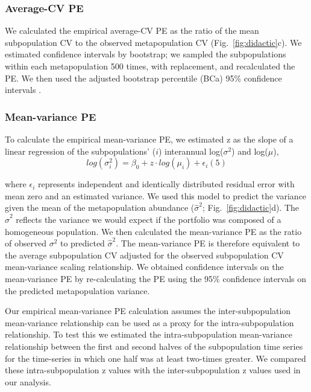 \subsubsection{Average-CV PE}

We calculated the empirical average-CV PE as the ratio of the mean subpopulation
CV to the observed metapopulation CV (Fig.~\ref{fig:didactic}c). We estimated
confidence intervals by bootstrap; we sampled the subpopulations within each
metapopulation 500 times, with replacement, and recalculated the PE. We then
used the adjusted bootstrap percentile (BCa) 95\% confidence intervals
\citep{canty2012}.

\subsubsection{Mean-variance PE}

To calculate the empirical mean-variance PE, we estimated z as the slope of a
linear regression of the subpopulations' ($i$) interannual log($\sigma^2$) and
log($\mu$),
\begin{equation}
  log(\sigma^2_i) = \beta_0 + z \cdot log(\mu_i) + \epsilon_i (5)
  \label{eq:linear-taylor}
\end{equation}

\noindent where $\epsilon_i$ represents independent and identically distributed
residual error with mean zero and an estimated variance. We used this model to
predict the variance given the mean of the metapopulation abundance
($\hat\sigma^2$; Fig.~\ref{fig:didactic}d). The $\hat\sigma^2$ reflects the
variance we would expect if the portfolio was composed of a homogeneous
population. We then calculated the mean-variance PE as the ratio of
observed $\sigma^2$ to predicted $\hat\sigma^2$. The mean-variance PE is
therefore equivalent to
the average subpopulation CV adjusted for the observed subpopulation CV
mean-variance scaling relationship.
We obtained confidence intervals on the mean-variance PE by
re-calculating the PE using the 95\% confidence intervals on the predicted
metapopulation variance.

Our empirical mean-variance PE calculation assumes the inter-subpopulation
mean-variance relationship can be used as a proxy for the intra-subpopulation
relationship. To test this we estimated the intra-subpopulation mean-variance
relationship between the first and second halves of the subpopulation time
series for the time-series in which one half was at least two-times greater. We
compared these intra-subpopulation z values with the inter-subpopulation z
values used in our analysis.

